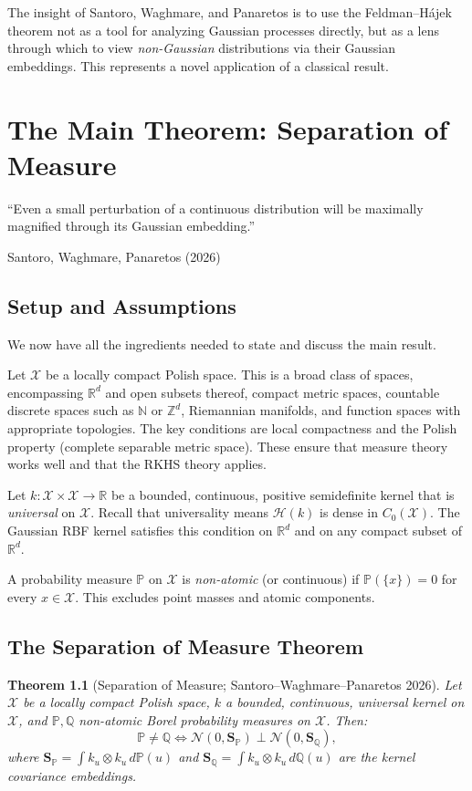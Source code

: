 \documentclass[12pt, oneside]{book}
\theoremstyle{plain}
\newtheorem{theorem}{Theorem}[chapter]
\theoremstyle{definition}
\newcommand{\R}{\mathbb{R}}
\newcommand{\N}{\mathbb{N}}
\newcommand{\Z}{\mathbb{Z}}
\newcommand{\calH}{\mathcal{H}}
\newcommand{\calX}{\mathcal{X}}
\newcommand{\calN}{\mathcal{N}}
\newcommand{\PP}{\mathbb{P}}
\newcommand{\QQ}{\mathbb{Q}}
\newcommand{\SP}{\mathbf{S}_{\PP}}
\newcommand{\SQ}{\mathbf{S}_{\QQ}}
\begin{document}
The insight of Santoro, Waghmare, and Panaretos is to use the Feldman--H\'ajek theorem not as a tool for analyzing Gaussian processes directly, but as a lens through which to view \emph{non-Gaussian} distributions via their Gaussian embeddings. This represents a novel application of a classical result.

\chapter{The Main Theorem: Separation of Measure}
\label{chap:main}

\epigraph{``Even a small perturbation of a continuous distribution will be
maximally magnified through its Gaussian embedding.''}{Santoro, Waghmare, Panaretos (2026)}

\section{Setup and Assumptions}

We now have all the ingredients needed to state and discuss the main result.

Let $\calX$ be a locally compact Polish space. This is a broad class of spaces, encompassing $\R^d$ and open subsets thereof, compact metric spaces, countable discrete spaces such as $\N$ or $\Z^d$, Riemannian manifolds, and function spaces with appropriate topologies.
The key conditions are local compactness and the Polish property (complete separable metric space). These ensure that measure theory works well and that the RKHS theory applies.

Let $k: \calX \times \calX \to \R$ be a bounded, continuous, positive semidefinite kernel that is \emph{universal} on $\calX$. Recall that universality means $\calH(k)$ is dense in $C_0(\calX)$. The Gaussian RBF kernel satisfies this condition on $\R^d$ and on any compact subset of $\R^d$.

A probability measure $\PP$ on $\calX$ is \emph{non-atomic} (or continuous) if $\PP(\{x\}) = 0$ for every $x \in \calX$. This excludes point masses and atomic components.

\section{The Separation of Measure Theorem}

\begin{theorem}[Separation of Measure; Santoro--Waghmare--Panaretos 2026]
\label{thm:separation}
Let $\calX$ be a locally compact Polish space, $k$ a bounded, continuous, universal kernel on $\calX$, and $\PP, \QQ$ non-atomic Borel probability measures on $\calX$. Then:
\begin{equation}
\PP \neq \QQ \iff \calN(0, \SP) \perp \calN(0, \SQ),
\label{eq:separation}
\end{equation}
where $\SP = \int k_u \otimes k_u\, d\PP(u)$ and $\SQ = \int k_u \otimes k_u\, d\QQ(u)$ are the kernel covariance embeddings.
\end{theorem}
\end{document}

